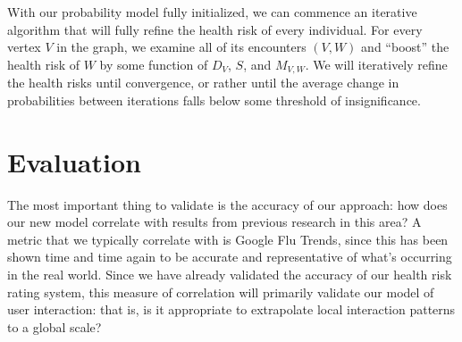 \documentclass[11pt, letterpaper]{article}
\begin{document}
            With our probability model fully initialized, we can commence an iterative algorithm that will fully refine the health risk of every individual. For every vertex $V$ in the graph, we examine all of its encounters $(V, W)$ and ``boost'' the health risk of $W$ by some function of $D_V$, $S$, and $M_{V,W}$. We will iteratively refine the health risks until convergence, or rather until the average change in probabilities between iterations falls below some threshold of insignificance.

    \section{Evaluation}
        The most important thing to validate is the accuracy of our approach: how does our new model correlate with results from previous research in this area? A metric that we typically correlate with is Google Flu Trends, since this has been shown time and time again to be accurate and representative of what's occurring in the real world. Since we have already validated the accuracy of our health risk rating system, this measure of correlation will primarily validate our model of user interaction: that is, is it appropriate to extrapolate local interaction patterns to a global scale?
    \newpage
    
    
\end{document}
